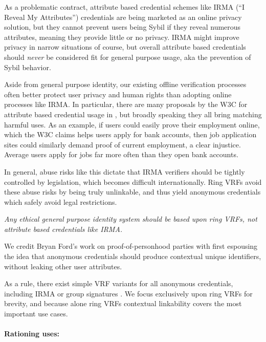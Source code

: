 As a problematic contract, attribute based credential schemes like
IRMA (``I Reveal My Attributes'') credentials \cite{IRMAcredentials}
are being marketed as an online privacy solution, but they cannot prevent
users being Sybil if they reveal numerous attributes, meaning they provide little or no privacy.
IRMA might improve privacy in narrow situations of course, but
overall attribute based credentials should {\it never} be considered
fit for general purpose usage, aka the prevention of Sybil behavior.

Aside from general purpose identity, our existing offline
verification processes often better protect user privacy and human
rights than adopting online processes like IRMA.
%
In particular, there are many proposals by the W3C for attribute based
credential usage in \cite{w3c_vc_use_cases}, but broadly speaking they
all bring matching harmful uses.  %
As an example, if users could easily prove their employment online, which
the W3C claims helps users apply for bank accounts, then job application
sites could similarly demand proof of current employment, a clear injustice.
Average users apply for jobs far more often than they open bank accounts.

In general, abuse risks like this dictate that IRMA verifiers should be
tightly controlled by legislation, which becomes difficult internationally. 
%
Ring VRFs avoid these abuse risks by being truly unlinkable, and thus
yield anonymous credentials which safely avoid legal restrictions.

{\it Any ethical general purpose identity system should be based
upon ring VRFs, not attribute based credentials like IRMA.}

We credit Bryan Ford's work on proof-of-personhood parties \cite{pop2008,pop2017}
with first espousing the idea that anonymous credentials should produce
contextual unique identifiers, without leaking other user attributes.

As a rule, there exist simple VRF variants for all anonymous credentials,
including IRMA \cite{IRMAcredentials} or group signatures \cite{group_sig_survey}.
We focus exclusively upon ring VRFs for brevity, and because alone
ring VRFs contextual linkability covers the most important use cases.

\paragraph{Rationing uses:}


